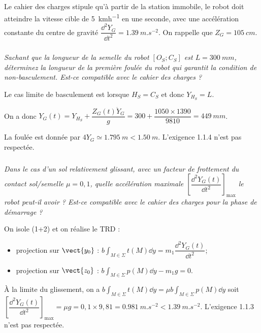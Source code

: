 \begin{multicols}{2}
Le cahier des charges stipule qu'à partir de la station immobile, le robot doit atteindre la vitesse cible de \SI{5}{kmh^{-1}} en une seconde, avec une accélération constante du centre de gravité $\dfrac{\dd^2 Y_G}{\dd t^2}=\SI{1,39}{m.s^{-2}}$.
On rappelle que $Z_G=\SI{105}{cm}$.

\fi


\subparagraph{} \textit{Sachant que la longueur de la semelle du robot $[O_S ;C_S]$ est $L=\SI{300}{mm}$, déterminez la longueur de la première foulée du robot qui garantit la condition de non-basculement. Est-ce compatible avec le
cahier des charges ?}
\ifprof
\begin{corrige}
Le cas limite de basculement est lorsque $H_S=C_S$ et donc $Y_{H_S}=L$. 

On a donc $Y_G(t) = Y_{H_S} + \dfrac{ Z_G(t) \ddot{Y}_G}{g} = 300+\dfrac{1050\times1390}{9 810} = \SI{449}{mm} $.

La foulée est donnée par $4Y_G\simeq  \SI{1,795}{m}<\SI{1,50}{m}$. L'exigence 1.1.4 n'est pas respectée.
\end{corrige}
\else
\fi



\subparagraph{} \textit{Dans le cas d'un sol relativement glissant, avec un facteur de frottement du contact sol/semelle
$\mu =0,1$, quelle accélération maximale $\left[\dfrac{\dd^2 Y_G(t)}{\dd t^2}\right]_{\text{max}}$ 
le robot peut-il avoir ? Est-ce compatible avec le
cahier des charges pour la phase de démarrage ?}
\ifprof
\begin{corrige}

On isole (1+2) et on réalise le TRD :
\begin{itemize}
\item projection sur $\vect{y_0}$ : $b\int_{M\in\Sigma}t(M) \dd y= m_1 \dfrac{\dd^2 Y_G(t)}{\dd t^2}$;

\item projection sur $\vect{z_0}$ : $b\int_{M\in\Sigma}p(M) \dd y - m_1 g  = 0$.
\end{itemize}

À la limite du glissement, on a $b\int_{M\in\Sigma}t(M) \dd y= \mu b\int_{M\in\Sigma}p(M) \dd y$ soit 
$\left[\dfrac{\dd^2 Y_G(t)}{\dd t^2}\right]_{\text{max}} = \mu  g = 0,1\times 9,81 = \SI{0,981}{m.s^{-2}} < \SI{1,39}{m.s^{-2}}$. L'exigence 1.1.3 n'est pas respectée. 
\end{corrige}
\else
\fi



\ifprof
\else
\end{multicols}
\fi

